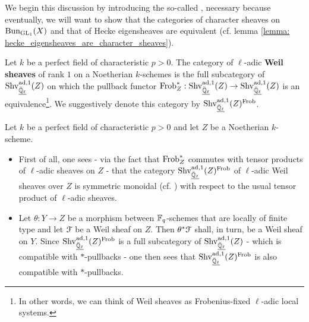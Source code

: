             We begin this discussion by introducing the so-called , necessary because eventually, we will want to show that the categories of character sheaves on $\mathrm{Bun}_{\operatorname{GL}_1}(X)$ and that of Hecke eigensheaves are equivalent (cf. lemma \ref{lemma: hecke_eigensheaves_are_character_sheaves}).
            \begin{definition} \label{def: weil_sheaves}
                Let $k$ be a perfect field of characteristic $p > 0$. The category of $\ell$-adic \textbf{Weil sheaves} of rank $1$ on a Noetherian $k$-schemes is the full subcategory of $\mathrm{Shv}_{\underline{\bar{\mathbb{Q}}_{\ell}}}^{\mathrm{ad}, 1}(Z)$ on which the pullback functor $\mathrm{Frob}_{Z}^*: \mathrm{Shv}_{\underline{\bar{\mathbb{Q}}_{\ell}}}^{\mathrm{ad}, 1}(Z) \to \mathrm{Shv}_{\underline{\bar{\mathbb{Q}}_{\ell}}}^{\mathrm{ad}, 1}(Z)$ is an equivalence\footnote{In other words, we can think of Weil sheaves as Frobenius-fixed $\ell$-adic local systems.}. We suggestively denote this category by $\mathrm{Shv}_{\underline{\bar{\mathbb{Q}}_{\ell}}}^{\mathrm{ad}, 1}(Z)^{\mathrm{Frob}}$.
            \end{definition}
            \begin{remark} \label{remark: properties_of_weil_sheaves}
                Let $k$ be a perfect field of characteristic $p > 0$ and let $Z$ be a Noetherian $k$-scheme. 
                \begin{itemize}
                    \item First of all, one sees - via the fact that $\mathrm{Frob}_Z^*$ commutes with tensor products of $\ell$-adic sheaves on $Z$ - that the category $\mathrm{Shv}_{\underline{\bar{\mathbb{Q}}_{\ell}}}^{\mathrm{ad}, 1}(Z)^{\mathrm{Frob}}$ of $\ell$-adic Weil sheaves over $Z$ is symmetric monoidal (cf. \cite[Definition 8.1.12]{EGNO}) with respect to the usual tensor product of $\ell$-adic sheaves.
                    \item \cite[Proposition 5.20]{tendler_2015_geometric_class_field_theory} Let $\theta: Y \to Z$ be a morphism between $\mathbb{F}_q$-schemes that are locally of finite type and let $\mathcal{F}$ be a Weil sheaf on $Z$. Then $\theta^*\mathcal{F}$ shall, in turn, be a Weil sheaf on $Y$. Since $\mathrm{Shv}_{\underline{\bar{\mathbb{Q}}_{\ell}}}^{\mathrm{ad}, 1}(Z)^{\mathrm{Frob}}$ is a full subcategory of $\mathrm{Shv}_{\underline{\bar{\mathbb{Q}}_{\ell}}}^{\mathrm{ad}, 1}(Z)$ - which is compatible with $*$-pullbacks - one then sees that $\mathrm{Shv}_{\underline{\bar{\mathbb{Q}}_{\ell}}}^{\mathrm{ad}, 1}(Z)^{\mathrm{Frob}}$ is also compatible with $*$-pullbacks.
                \end{itemize}
            \end{remark}
            

